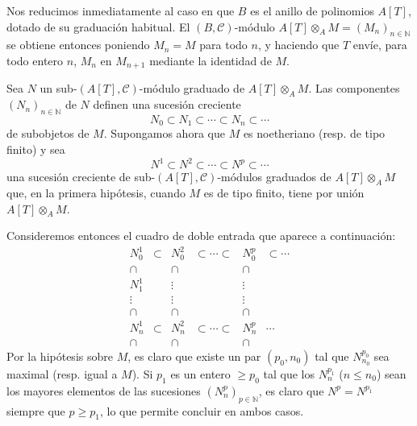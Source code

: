 \begin{prooftext}
Nos reducimos inmediatamente al caso en que \(B\) es el anillo de polinomios \(A[T]\), dotado de su graduación habitual. El \((B,\mathcal C)\)-módulo \(A[T]\otimes_A M=(M_n)_{n\in\mathbb N}\) se obtiene entonces poniendo \(M_n=M\) para todo \(n\), y haciendo que \(T\) envíe, para todo entero \(n\), \(M_n\) en \(M_{n+1}\) mediante la identidad de \(M\).

Sea \(N\) un sub-\((A[T],\mathcal C)\)-módulo graduado de \(A[T]\otimes_A M\). Las componentes \((N_n)_{n\in\mathbb N}\) de \(N\) definen una sucesión creciente
\[
N_0\subset N_1\subset\cdots\subset N_n\subset\cdots
\]
de subobjetos de \(M\). Supongamos ahora que \(M\) es noetheriano (resp. de tipo finito) y sea
\[
N^1\subset N^2\subset\cdots\subset N^p\subset\cdots
\]
una sucesión creciente de sub-\((A[T],\mathcal C)\)-módulos graduados de \(A[T]\otimes_A M\) que, en la primera hipótesis, cuando \(M\) es de tipo finito, tiene por unión \(A[T]\otimes_A M\).

Consideremos entonces el cuadro de doble entrada que aparece a continuación:
\[
\begin{array}{cccccc}
N_0^1&\subset&N_0^2&\subset\cdots\subset&N_0^p&\subset\cdots\\
\cap&&\cap&&\cap\\
N_1^1&&\vdots&&\vdots\\
\vdots&&\vdots&&\vdots\\
\cap&&\cap&&\cap\\
N_n^1&\subset&N_n^2&\subset\cdots\subset&N_n^p&\cdots\\
\cap&&\cap&&\cap
\end{array}
\]
Por la hipótesis sobre \(M\), es claro que existe un par \((p_0,n_0)\) tal que \(N^{p_0}_{n_0}\) sea maximal (resp. igual a \(M\)). Si \(p_1\) es un entero \(\ge p_0\) tal que los \(N_n^{p_1}\) (\(n\le n_0\)) sean los mayores elementos de las sucesiones \((N_n^p)_{p\in\mathbb N}\), es claro que \(N^p=N^{p_1}\) siempre que \(p\ge p_1\), lo que permite concluir en ambos casos.
\end{prooftext}
